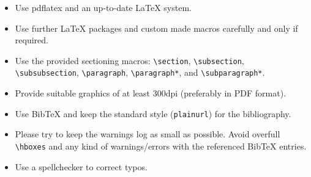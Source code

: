 \documentclass[a4paper,UKenglish,cleveref, autoref, thm-restate]{lipics-v2021}
\begin{document}
\begin{itemize}
\item Use pdflatex and an up-to-date \LaTeX{} system.
\item Use further \LaTeX{} packages and custom made macros carefully and only if required.
\item Use the provided sectioning macros: \verb+\section+, \verb+\subsection+, \verb+\subsubsection+, \linebreak \verb+\paragraph+, \verb+\paragraph*+, and \verb+\subparagraph*+.
\item Provide suitable graphics of at least 300dpi (preferably in PDF format).
\item Use BibTeX and keep the standard style (\verb+plainurl+) for the bibliography.
\item Please try to keep the warnings log as small as possible. Avoid overfull \verb+\hboxes+ and any kind of warnings/errors with the referenced BibTeX entries.
\item Use a spellchecker to correct typos.
\end{itemize}
\end{document}
